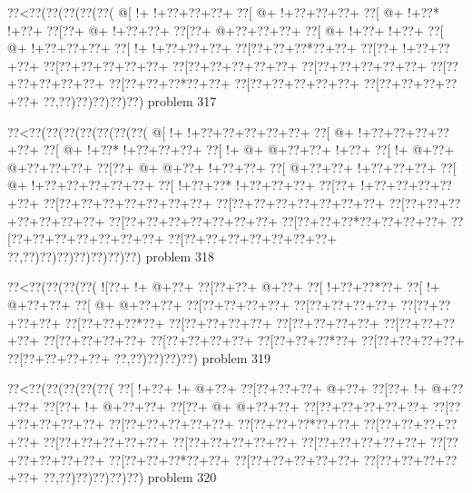 \vbox{\vbox{\goo
\0??<\0??(\0??(\0??(\0??(\0??(
\- @[\- !+\- !+\0??+\0??+\0??+
\0??[\- @+\- !+\0??+\0??+\0??+
\0??[\- @+\- !+\0??*\- !+\0??+
\0??[\0??+\- @+\- !+\0??+\0??+
\0??[\0??+\- @+\0??+\0??+\0??+
\0??[\- @+\- !+\0??+\- !+\0??+
\0??[\- @+\- !+\0??+\0??+\0??+
\0??[\- !+\- !+\0??+\0??+\0??+
\0??[\0??+\0??+\0??*\0??+\0??+
\0??[\0??+\- !+\0??+\0??+\0??+
\0??[\0??+\0??+\0??+\0??+\0??+
\0??[\0??+\0??+\0??+\0??+\0??+
\0??[\0??+\0??+\0??+\0??+\0??+
\0??[\0??+\0??+\0??+\0??+\0??+
\0??[\0??+\0??+\0??*\0??+\0??+
\0??[\0??+\0??+\0??+\0??+\0??+
\0??[\0??+\0??+\0??+\0??+\0??+
\0??,\0??)\0??)\0??)\0??)\0??)
}
\hfil problem 317\hfil\break
}

\vbox{\vbox{\goo
\0??<\0??(\0??(\0??(\0??(\0??(\0??(\0??(
\- @[\- !+\- !+\0??+\0??+\0??+\0??+\0??+
\0??[\- @+\- !+\0??+\0??+\0??+\0??+\0??+
\0??[\- @+\- !+\0??*\- !+\0??+\0??+\0??+
\0??[\- !+\- @+\- @+\0??+\0??+\- !+\0??+
\0??[\- !+\- @+\0??+\- @+\0??+\0??+\0??+
\0??[\0??+\- @+\- @+\0??+\- !+\0??+\0??+
\0??[\- @+\0??+\0??+\- !+\0??+\0??+\0??+
\0??[\- @+\- !+\0??+\0??+\0??+\0??+\0??+
\0??[\- !+\0??+\0??*\- !+\0??+\0??+\0??+
\0??[\0??+\- !+\0??+\0??+\0??+\0??+\0??+
\0??[\0??+\0??+\0??+\0??+\0??+\0??+\0??+
\0??[\0??+\0??+\0??+\0??+\0??+\0??+\0??+
\0??[\0??+\0??+\0??+\0??+\0??+\0??+\0??+
\0??[\0??+\0??+\0??+\0??+\0??+\0??+\0??+
\0??[\0??+\0??+\0??*\0??+\0??+\0??+\0??+
\0??[\0??+\0??+\0??+\0??+\0??+\0??+\0??+
\0??[\0??+\0??+\0??+\0??+\0??+\0??+\0??+
\0??,\0??)\0??)\0??)\0??)\0??)\0??)\0??)
}
\hfil problem 318\hfil\break
}

\vbox{\vbox{\goo
\0??<\0??(\0??(\0??(\0??(
\- ![\0??+\- !+\- @+\0??+
\0??[\0??+\0??+\- @+\0??+
\0??[\- !+\0??+\0??*\0??+
\0??[\- !+\- @+\0??+\0??+
\0??[\- @+\- @+\0??+\0??+
\0??[\0??+\0??+\0??+\0??+
\0??[\0??+\0??+\0??+\0??+
\0??[\0??+\0??+\0??+\0??+
\0??[\0??+\0??+\0??*\0??+
\0??[\0??+\0??+\0??+\0??+
\0??[\0??+\0??+\0??+\0??+
\0??[\0??+\0??+\0??+\0??+
\0??[\0??+\0??+\0??+\0??+
\0??[\0??+\0??+\0??+\0??+
\0??[\0??+\0??+\0??*\0??+
\0??[\0??+\0??+\0??+\0??+
\0??[\0??+\0??+\0??+\0??+
\0??,\0??)\0??)\0??)\0??)
}
\hfil problem 319\hfil\break
}

\vbox{\vbox{\goo
\0??<\0??(\0??(\0??(\0??(\0??(
\0??[\- !+\0??+\- !+\- @+\0??+
\0??[\0??+\0??+\0??+\- @+\0??+
\0??[\0??+\- !+\- @+\0??+\0??+
\0??[\0??+\- !+\- @+\0??+\0??+
\0??[\0??+\- @+\- @+\0??+\0??+
\0??[\0??+\0??+\0??+\0??+\0??+
\0??[\0??+\0??+\0??+\0??+\0??+
\0??[\0??+\0??+\0??+\0??+\0??+
\0??[\0??+\0??+\0??*\0??+\0??+
\0??[\0??+\0??+\0??+\0??+\0??+
\0??[\0??+\0??+\0??+\0??+\0??+
\0??[\0??+\0??+\0??+\0??+\0??+
\0??[\0??+\0??+\0??+\0??+\0??+
\0??[\0??+\0??+\0??+\0??+\0??+
\0??[\0??+\0??+\0??*\0??+\0??+
\0??[\0??+\0??+\0??+\0??+\0??+
\0??[\0??+\0??+\0??+\0??+\0??+
\0??,\0??)\0??)\0??)\0??)\0??)
}
\hfil problem 320\hfil\break
}

